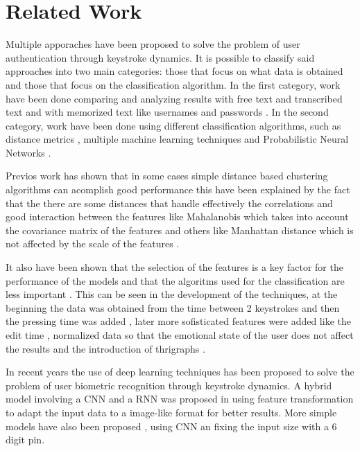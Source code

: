 \section{Related Work}

Multiple apporaches have been proposed to solve the problem of user authentication through keystroke dynamics. It is possible to classify said approaches into two main categories: those that focus on what data is obtained and those that focus on the classification algorithm. In the first category, work have been done comparing and analyzing results with free text and transcribed text \cite{old,programmers} and with memorized text like usernames and passwords \cite{bleha1990login, pnn}. In the second category, work have been done using different classification algorithms, such as distance metrics \cite{combine_distance}, multiple machine learning techniques \cite{machine_learning} and Probabilistic Neural Networks \cite{pnn}.

Previos work has shown that in some cases simple distance based clustering algorithms can acomplish good performance \cite{robinson1998login, bergadano2002norm_distance} this have been explained by the fact that the there are some distances that handle effectively the correlations  and good interaction between the features like Mahalanobis which takes into account the covariance matrix of the features and others like Manhattan distance which is not affected by the scale of the features \cite{combine_distance}. 

It also have been shown that the selection of the features is a key factor for the performance of the models and that the algoritms used for the classification are less important \cite{pnn}. This can be seen in the development of the techniques, at the beginning the data was obtained from the time between 2 keystrokes  \cite{bleha1990login} and then the pressing time was added \cite{robinson1998login}, later more sofisticated features were added like the edit time \cite{machine_learning}, normalized data so that the emotional state of the user does not affect the results  and the introduction of thrigraphs \cite{bergadano2002norm_distance}.

In recent years the use of deep learning techniques has been proposed to solve the problem of user biometric recognition through keystroke dynamics. A hybrid model involving a CNN and a RNN was proposed in \cite{deep_learning} using feature transformation to adapt the input data to a image-like format for better results. More simple models have also been proposed \cite{maiorana2019deepkey}, using CNN an fixing the input size with a 6 digit pin.